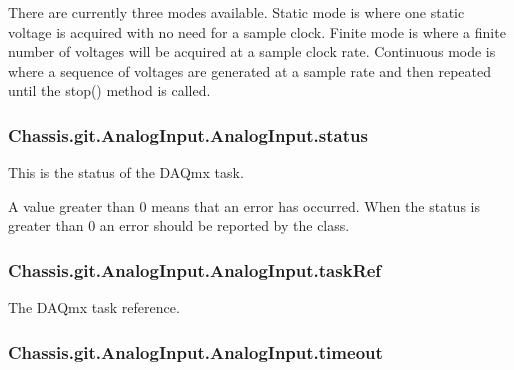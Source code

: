 There are currently three modes available. Static mode is where one static voltage is acquired with no need for a sample clock. Finite mode is where a finite number of voltages will be acquired at a sample clock rate. Continuous mode is where a sequence of voltages are generated at a sample rate and then repeated until the stop() method is called. \hypertarget{class_chassis_8git_1_1_analog_input_1_1_analog_input_a8708c56cbdab15b27fa69a4612320789}{
\subsubsection[{status}]{\setlength{\rightskip}{0pt plus 5cm}Chassis.\-git.\-Analog\-Input.\-Analog\-Input.\-status}}\label{class_chassis_8git_1_1_analog_input_1_1_analog_input_a8708c56cbdab15b27fa69a4612320789}


This is the status of the D\-A\-Qmx task. 

A value greater than 0 means that an error has occurred. When the status is greater than 0 an error should be reported by the class. \hypertarget{class_chassis_8git_1_1_analog_input_1_1_analog_input_a6f0dccdf025bc556dbc23d8679c57634}{
\subsubsection[{task\-Ref}]{\setlength{\rightskip}{0pt plus 5cm}Chassis.\-git.\-Analog\-Input.\-Analog\-Input.\-task\-Ref}}\label{class_chassis_8git_1_1_analog_input_1_1_analog_input_a6f0dccdf025bc556dbc23d8679c57634}


The D\-A\-Qmx task reference. 

\hypertarget{class_chassis_8git_1_1_analog_input_1_1_analog_input_a34c7451ada43f7d73cc2598e3ef0bd73}{
\subsubsection[{timeout}]{\setlength{\rightskip}{0pt plus 5cm}Chassis.\-git.\-Analog\-Input.\-Analog\-Input.\-timeout}}\label{class_chassis_8git_1_1_analog_input_1_1_analog_input_a34c7451ada43f7d73cc2598e3ef0bd73}


